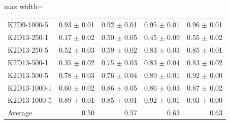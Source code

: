 \documentclass{article}
\begin{document}
\begin{table}[ht]
\begin{center}
\begin{small}
\begin{adjustbox}{max width=\columnwidth}
\begin{tabular}{l|rrrr}
K2D9-1000-5 & 0.93 $\pm$ 0.01 & 0.92 $\pm$ 0.01 & 0.95 $\pm$ 0.01 & 0.96 $\pm$ 0.01\\
K2D13-250-1 & 0.17 $\pm$ 0.02 & 0.50 $\pm$ 0.05 & 0.45 $\pm$ 0.09 & 0.55 $\pm$ 0.02\\
K2D13-250-5 & 0.52 $\pm$ 0.03 & 0.59 $\pm$ 0.02 & 0.83 $\pm$ 0.03 & 0.85 $\pm$ 0.01\\
K2D13-500-1 & 0.35 $\pm$ 0.02 & 0.75 $\pm$ 0.03 & 0.83 $\pm$ 0.04 & 0.83 $\pm$ 0.02\\
K2D13-500-5 & 0.78 $\pm$ 0.03 & 0.76 $\pm$ 0.04 & 0.89 $\pm$ 0.01 & 0.92 $\pm$ 0.00\\
K2D13-1000-1 & 0.60 $\pm$ 0.02 & 0.86 $\pm$ 0.05 & 0.86 $\pm$ 0.03 & 0.87 $\pm$ 0.02\\
K2D13-1000-5 & 0.89 $\pm$ 0.01 & 0.85 $\pm$ 0.01 & 0.92 $\pm$ 0.01 & 0.93 $\pm$ 0.00\\
\midrule
Average & 0.50 & 0.57 & 0.63 & 0.63\\
\end{tabular}
        \end{adjustbox}
    \end{small}
    \end{center}
    \vskip -0.1in
\end{table}
\FloatBarrier
\end{document}
